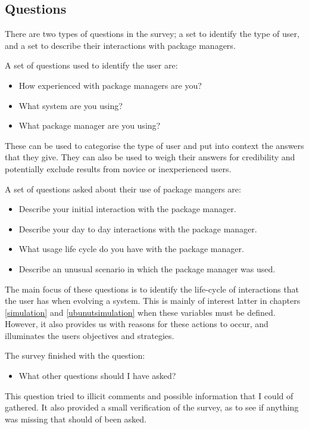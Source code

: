 \subsection{Questions}
There are two types of questions in the survey; a set to identify the type of user, and a set to describe their interactions with package managers.

A set of questions used to identify the user are:
\begin{itemize}
  \item How experienced with package managers are you? 
  \item What system are you using?
  \item What package manager are you using?
\end{itemize}
These can be used to categorise the type of user and put into context the answers that they give.
They can also be used to weigh their answers for credibility and potentially exclude results from novice or inexperienced users. 

A set of questions asked about their use of package mangers are:
\begin{itemize}
  \item Describe your initial interaction with the package manager.
  \item Describe your day to day interactions with the package manager.
  \item What usage life cycle do you have with the package manager.
  \item Describe an unusual scenario in which the package manager was used.
\end{itemize}
The main focus of these questions is to identify the life-cycle of interactions that the user has when evolving a system.
This is mainly of interest latter in chapters \ref{simulation} and \ref{ubunutsimulation} when these variables must be defined.
However, it also provides us with reasons for these actions to occur, and illuminates the users objectives and strategies.

The survey finished with the question:
\begin{itemize}
  \item What other questions should I have asked?
\end{itemize}
This question tried to illicit comments and possible information that I could of gathered.
It also provided a small verification of the survey, as to see if anything was missing that should of been asked.


